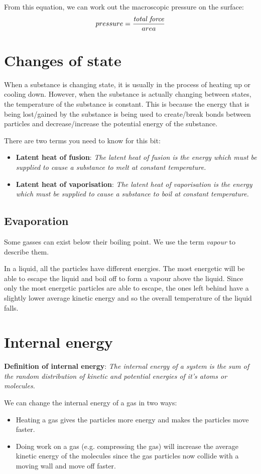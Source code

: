 \documentclass{article}
\begin{document}
From this equation, we can work out the macroscopic pressure on the surface:
\[
	pressure = \frac{\textrm{\textit{total force}}}{area}
\]

\section*{Changes of state}
When a substance is changing state, it is usually in the process of heating up 
or cooling down. However, when the substance is actually changing between
states, the temperature of the substance is constant. This is because the energy
that is being lost/gained by the substance is being used to create/break bonds
between particles and decrease/increase the potential energy of the substance.

There are two terms you need to know for this bit:
\begin{itemize}
	\item \textbf{Latent heat of fusion}: \textit{The latent heat of fusion is
	the energy which must be supplied to cause a substance to melt at constant
	temperature.}
	\item \textbf{Latent heat of vaporisation}: \textit{The latent heat of
	vaporisation is the energy which must be supplied to cause a substance to
	boil at constant temperature.}
\end{itemize}
	
\subsection*{Evaporation}
Some gasses can exist below their boiling point. We use the term \textit{vapour}
to describe them.

In a liquid, all the particles have different energies. The most energetic will
be able to escape the liquid and boil off to form a vapour above the liquid.
Since only the most energetic particles are able to escape, the ones left behind
have a slightly lower average kinetic energy and so the overall temperature of
the liquid falls.

\section*{Internal energy}
\textbf{Definition of internal energy}: \textit{The internal energy of a system
is the sum of the random distribution of kinetic and potential energies of it's
atoms or molecules.}

We can change the internal energy of a gas in two ways:
\begin{itemize}
	\item Heating a gas gives the particles more energy and makes the particles
	move faster.
	\item Doing work on a gas (e.g. compressing the gas) will increase the
	average kinetic energy of the molecules since the gas particles now collide
	with a moving wall and move off faster.
\end{itemize}
\end{document}
